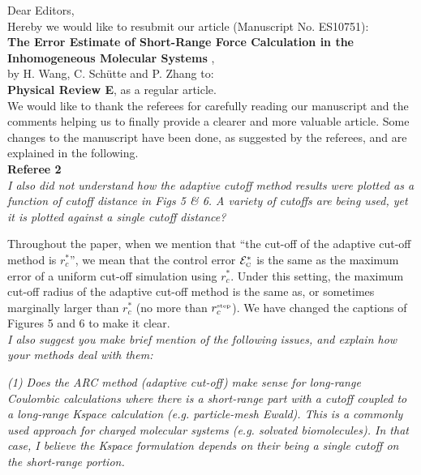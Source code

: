 \documentclass[a4paper]{article}
\begin{document}
\noindent
{Dear Editors,}\\

Hereby we would like to resubmit our article
(Manuscript No. ES10751):\\

\textbf{The Error Estimate of Short-Range Force Calculation in the Inhomogeneous Molecular Systems
},\\

by H. Wang, C. Sch\"utte and P. Zhang to:\\

\textbf{Physical Review E}, as a regular article.\\

We would like to thank the referees for carefully reading our
manuscript and the comments helping us to finally provide a clearer
and more valuable article.  Some changes to the manuscript have been
done, as suggested by the
referees, and are explained in the following.\\

\textbf{Referee 2}\\

\textit{I also did not understand how the adaptive cutoff method results were
plotted as a function of cutoff distance in Figs 5 \& 6. A variety of
cutoffs are being used, yet it is plotted against a single cutoff
distance?}

Throughout the paper, when we mention
that ``the cut-off of
the adaptive cut-off method is $r_c^\ast$'', we mean that the
control error  $\mathcal E^\ast_{\textrm{\tiny{C}}}$
is the same as the maximum error of a uniform cut-off simulation
using $r_c^\ast$.
Under this setting,  the maximum 
cut-off radius of the adaptive cut-off method is the same as,
or sometimes marginally larger  than
$r_c^\ast$ (no more than $r_c^{\textrm{\tiny{step}}}$).
We have changed the captions of Figures 5 and 6 to make it clear.
\\

\textit{
I also suggest you make brief mention of the following issues, and
explain how your methods deal with them:
}

\textit{
(1) Does the ARC method (adaptive cut-off) make sense for long-range
Coulombic calculations where there is a short-range part with a cutoff
coupled to a long-range Kspace calculation (e.g. particle-mesh Ewald).
This is a commonly used approach for charged molecular systems (e.g.
solvated biomolecules). In that case, I believe the Kspace formulation
depends on their being a single cutoff on the short-range portion.
}
\end{document}
